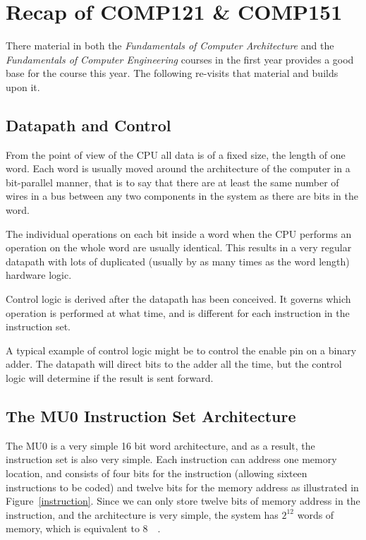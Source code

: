 

\section{Recap of COMP121 \& COMP151}

There material in both the {\it Fundamentals of Computer Architecture} and the
{\it Fundamentals of Computer Engineering} courses in the first year provides a
good base for the course this year. The following re-visits that material and
builds upon it.

\subsection{Datapath and Control}

From the point of view of the CPU all data is of a fixed size, the length of one
word. Each word is usually moved around the architecture of the computer in a
bit-parallel manner, that is to say that there are at least the same number of
wires in a bus between any two components in the system as there are bits in the
word.

The individual operations on each bit inside a word when the CPU performs an
operation on the whole word are usually identical. This results in a very
regular datapath with lots of duplicated (usually by as many times as the word
length) hardware logic.

Control logic is derived after the datapath has been conceived. It governs which
operation is performed at what time, and is different for each instruction in
the instruction set.

A typical example of control logic might be to control the enable pin on a
binary adder. The datapath will direct bits to the adder all the time, but the
control logic will determine if the result is sent forward.

\subsection{The MU0 Instruction Set Architecture}

The MU0 is a very simple 16 bit word architecture, and as a result, the
instruction set is also very simple. Each instruction can address one memory
location, and consists of four bits for the instruction (allowing sixteen
instructions to be coded) and twelve bits for the memory address as illustrated
in Figure~\ref{instruction}. Since we can only store twelve bits of memory
address in the instruction, and the architecture is very simple, the system has
$2^{12}$ words of memory, which is equivalent to \SI{8}{\kilo\byte}.

